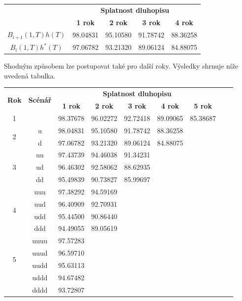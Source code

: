 \documentclass[a4paper]{book}
\begin{document}
\begin{center}
\begin{tabular}{c c c c c }
                            & \multicolumn{4}{c}{\textbf{Splatnost dluhopisu}}\\
                            & \textbf{1 rok} & \textbf{2 rok} & \textbf{3 rok} & \textbf{4 rok} \\
\hline
\textbf{$B_{i+1}(1,T)h(T)$} & 98.04831 & 95.10580 & 91.78742 & 88.36258 \\
\textbf{$B_i(1,T)h^{*}(T)$} & 97.06782 & 93.21320 & 89.06124 & 84.88075
\end{tabular}
\end{center}
Shodným způsobem lze postupovat také pro další roky. Výsledky shrnuje níže uvedená tabulka.
\begin{center}
\begin{tabular}{c c c c c c c c c}
\multirow{2}{*}{\textbf{Rok}} & \multirow{2}{*}{\textbf{Scénář}} & \multicolumn{5}{c}{\textbf{Splatnost dluhopisu}}\\	
 & & \textbf{1 rok} & \textbf{2 rok} & \textbf{3 rok} & \textbf{4 rok} & \textbf{5 rok}\\
\hline
1                  &       & 98.37678 & 96.02272 & 92.72418 & 89.09065 & 85.38687\\
\multirow{2}{*}{2} & u     & 98.04831 &	95.10580 & 91.78742 & 88.36258 & \\
                   & d     & 97.06782 &	93.21320 & 89.06124 & 84.88075 & \\
\multirow{3}{*}{3} & uu    & 97.43739 &	94.46038 & 91.34231 &          & \\
                   & ud    & 96.46302 &	92.58062 & 88.62935 &          & \\
                   & dd    & 95.49839 &	90.73827 & 85.99697 &          & \\
\multirow{4}{*}{4} & uuu   & 97.38292 &	94.59169 &          &          & \\
                   & uud   & 96.40909 &	92.70931 &          &          & \\
                   & udd   & 95.44500 &	90.86440 &          &          & \\
                   & ddd   & 94.49055 &	89.05619 &          &          & \\
\multirow{4}{*}{5} & uuuu  & 97.57283 &          &          &          & \\
                   & uuud  & 96.59710 &          &          &          & \\
                   & uudd  & 95.63113 &          &          &          & \\
                   & uddd  & 94.67482 &          &          &          & \\
                   & dddd  & 93.72807 &          &          &          &
\end{tabular}
\end{center}
\end{document}
